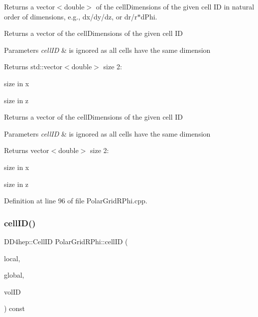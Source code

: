 Returns a vector$<$double$>$ of the cell\+Dimensions of the given cell ID in natural order of dimensions, e.\+g., dx/dy/dz, or dr/r$\ast$d\+Phi. 

Returns a vector of the cell\+Dimensions of the given cell ID 
\begin{DoxyParams}{Parameters}
{\em cell\+ID} & is ignored as all cells have the same dimension \\
\hline
\end{DoxyParams}
\begin{DoxyReturn}{Returns}
std\+::vector$<$double$>$ size 2\+:
\begin{DoxyEnumerate}
\item size in x
\item size in z
\end{DoxyEnumerate}
\end{DoxyReturn}
Returns a vector of the cell\+Dimensions of the given cell ID 
\begin{DoxyParams}{Parameters}
{\em cell\+ID} & is ignored as all cells have the same dimension \\
\hline
\end{DoxyParams}
\begin{DoxyReturn}{Returns}
vector$<$double$>$ size 2\+:
\begin{DoxyEnumerate}
\item size in x
\item size in z 
\end{DoxyEnumerate}
\end{DoxyReturn}


Definition at line 96 of file Polar\+Grid\+R\+Phi.\+cpp.

\hypertarget{class_d_d4hep_1_1_geometry_1_1_polar_grid_r_phi_a046347fac14370939120a716b606d5cb}{}\label{class_d_d4hep_1_1_geometry_1_1_polar_grid_r_phi_a046347fac14370939120a716b606d5cb} 
\subsubsection{\texorpdfstring{cell\+I\+D()}{cellID()}}
{\footnotesize\ttfamily D\+D4hep\+::\+Cell\+ID Polar\+Grid\+R\+Phi\+::cell\+ID (\begin{DoxyParamCaption}\item[{const \hyperlink{namespace_d_d4hep_1_1_geometry_a55083902099d03506c6db01b80404900}{Position} \&}]{local,  }\item[{const \hyperlink{namespace_d_d4hep_1_1_geometry_a55083902099d03506c6db01b80404900}{Position} \&}]{global,  }\item[{const Volume\+ID \&}]{vol\+ID }\end{DoxyParamCaption}) const}



